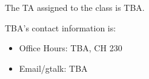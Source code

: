 The TA assigned to the class is TBA. 

TBA's contact information is:
\begin{itemize}
\item Office Hours: TBA, CH 230
\item Email/gtalk: TBA  
\end{itemize}
